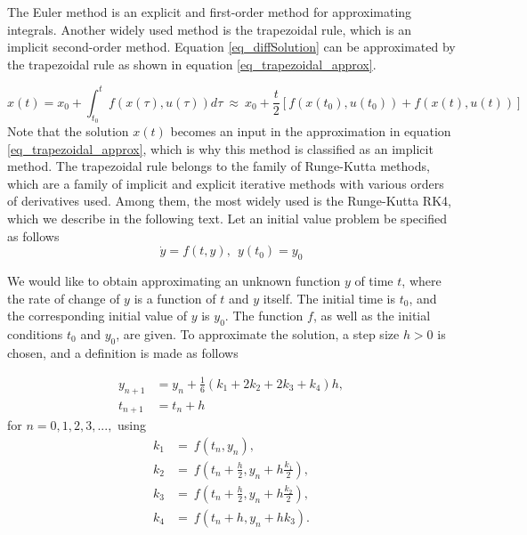 \documentclass  [
  paper    = a4,
  BCOR     = 10mm,
  twoside,
  fontsize = 12pt,
  fleqn,
  toc      = bibnumbered,
  toc      = listofnumbered,
  numbers  = noendperiod,
  headings = normal,
  listof   = leveldown,
  version  = 3.03
]                                       {scrreprt}
\newcommand{\<}{\langle}
\renewcommand{\>}{\rangle}
\begin{document}
The Euler method is an explicit and first-order method for approximating integrals. Another widely used method is the trapezoidal rule, which is an implicit second-order method. Equation \ref{eq_diffSolution} can be approximated by the trapezoidal rule as shown in equation \ref{eq_trapezoidal_approx}. 

\begin{equation}
	x(t)  = x_0  + \int_{t_0}^{t}  f(x(\tau), u(\tau)) d \tau \ \approx \   x_0  + \frac{t}{2}[f(x(t_0), u(t_0)) + f(x(t), u(t))]  
	\label{eq_trapezoidal_approx}
\end{equation}
Note that the solution $x(t)$ becomes an input in the approximation in equation \ref{eq_trapezoidal_approx}, which is why this method is classified as an implicit method. The trapezoidal rule belongs to the family of Runge-Kutta methods, which are a family of implicit and explicit iterative methods with various orders of derivatives used. Among them, the most widely used is the Runge-Kutta RK4, which we describe in the following text. Let an initial value problem be specified as follows
\begin{equation}\label{eqn:RK4_diff}
	\dot{y} = f(t, y), \ \ y(t_0) = y_0
\end{equation}

We would like to obtain approximating an unknown function $y$ of time $t$, where the rate of change of $y$ is a function of $t$ and $y$ itself. The initial time is $t_0$, and the corresponding initial value of $y$ is $y_0$. The function $f$, as well as the initial conditions $t_0$ and $y_0$, are given. To approximate the solution, a step size $h>0$ is chosen, and a definition is made as follows

  	\begin{align}
  		y_{n+1} &= y_n + \frac{1}{6}\left(k_1 + 2k_2 + 2k_3 + k_4 \right)h,\\
  		t_{n+1} &= t_n + h
  	\end{align}
  	for $n = 0, 1, 2, 3, ...,$ using
  	\begin{align}
  		k_1 &= \ f(t_n, y_n), \\
  		k_2 &= \ f\!\left(t_n + \frac{h}{2}, y_n + h\frac{k_1}{2}\right), \\ 
  		k_3 &= \ f\!\left(t_n + \frac{h}{2}, y_n + h\frac{k_2}{2}\right), \\
  		k_4 &= \ f\!\left(t_n + h, y_n + hk_3\right).
  	\end{align}
  	
\end{document}
